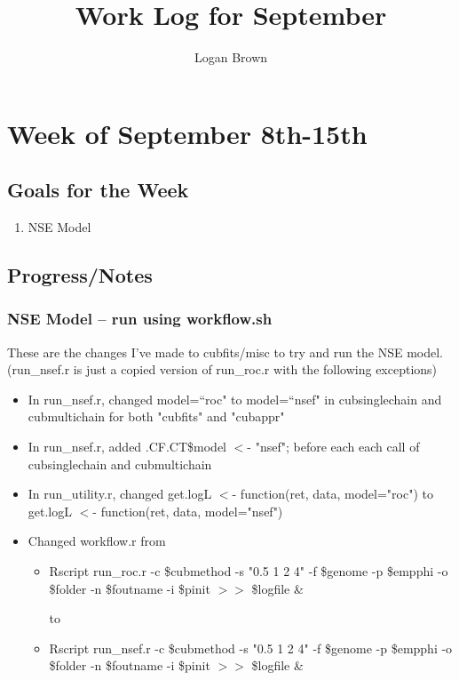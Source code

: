 \documentclass[11pt]{article} %
\title{Work Log for September}
\author{Logan Brown}
\begin{document}
\maketitle


\setcounter{section}{1} %
\setcounter{subsection}{-1}
\setcounter{subsubsection}{0}

\section{Week of September 8th-15th}
\subsection{Goals for the Week}

\begin{enumerate}
\item NSE Model

\end{enumerate}

\subsection{Progress/Notes}

\subsubsection{NSE Model -- run using workflow.sh}
These are the changes I've made to cubfits/misc to try and run the NSE model. (run\_nsef.r is just a copied version of run\_roc.r with the following exceptions)
\begin{itemize}
\item In run\_nsef.r, changed model=``roc" to model=``nsef" in cubsinglechain and cubmultichain for both "cubfits" and "cubappr"
\item In run\_nsef.r, added .CF.CT\$model $<$- "nsef"; before each each call of cubsinglechain and cubmultichain
\item In run\_utility.r, changed get.logL $<$- function(ret, data, model="roc") to get.logL $<$- function(ret, data, model="nsef")
\item Changed workflow.r from 
\begin{itemize}
\item Rscript run\_roc.r -c \$cubmethod -s "0.5 1 2 4" -f \$genome -p \$empphi -o \$folder -n \$foutname -i \$pinit $>>$ \$logfile \& 

to

\item Rscript run\_nsef.r -c \$cubmethod -s "0.5 1 2 4" -f \$genome -p \$empphi -o \$folder -n \$foutname -i \$pinit $>>$ \$logfile \&
\end{itemize}
\end{itemize}
\end{document}

